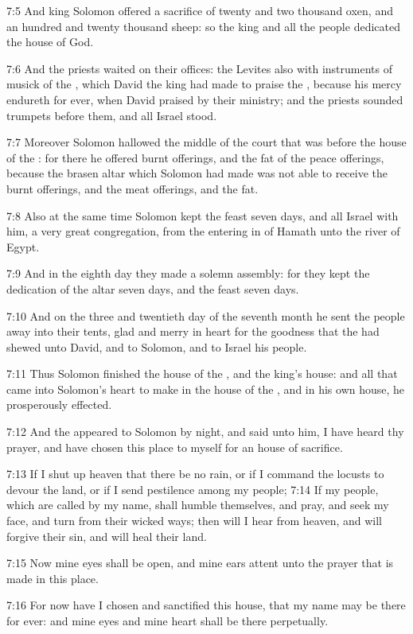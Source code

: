 7:5 And king Solomon offered a sacrifice of twenty and two thousand oxen, and an hundred and twenty thousand sheep: so the king and all the people dedicated the house of God.

7:6 And the priests waited on their offices: the Levites also with instruments of musick of the \LORD, which David the king had made to praise the \LORD, because his mercy endureth for ever, when David praised by their ministry; and the priests sounded trumpets before them, and all Israel stood.

7:7 Moreover Solomon hallowed the middle of the court that was before the house of the \LORD: for there he offered burnt offerings, and the fat of the peace offerings, because the brasen altar which Solomon had made was not able to receive the burnt offerings, and the meat offerings, and the fat.

7:8 Also at the same time Solomon kept the feast seven days, and all Israel with him, a very great congregation, from the entering in of Hamath unto the river of Egypt.

7:9 And in the eighth day they made a solemn assembly: for they kept the dedication of the altar seven days, and the feast seven days.

7:10 And on the three and twentieth day of the seventh month he sent the people away into their tents, glad and merry in heart for the goodness that the \LORD had shewed unto David, and to Solomon, and to Israel his people.

7:11 Thus Solomon finished the house of the \LORD, and the king's house: and all that came into Solomon's heart to make in the house of the \LORD, and in his own house, he prosperously effected.

7:12 And the \LORD appeared to Solomon by night, and said unto him, I have heard thy prayer, and have chosen this place to myself for an house of sacrifice.

7:13 If I shut up heaven that there be no rain, or if I command the locusts to devour the land, or if I send pestilence among my people; 7:14 If my people, which are called by my name, shall humble themselves, and pray, and seek my face, and turn from their wicked ways; then will I hear from heaven, and will forgive their sin, and will heal their land.

7:15 Now mine eyes shall be open, and mine ears attent unto the prayer that is made in this place.

7:16 For now have I chosen and sanctified this house, that my name may be there for ever: and mine eyes and mine heart shall be there perpetually.

